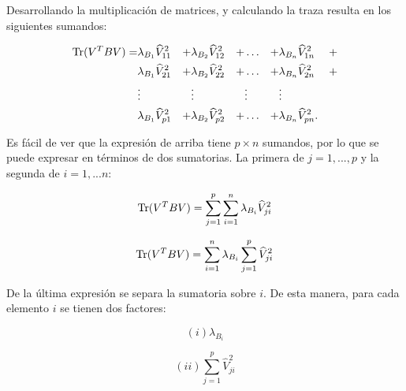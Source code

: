 Desarrollando la multiplicación de matrices, y calculando la traza resulta en los siguientes sumandos:
 
 \begin{equation*}
\begin{aligned}
      \operatorname{Tr}(V^T B V) =& \lambda_{B_1} \widehat{V}_{11}^2&  +
                     & \lambda_{B_2} \widehat{V}_{12}^2& +
                     & \hdots& +
                     &\lambda_{B_n} \widehat{V}_{1n}^2& + \\
                     & \lambda_{B_1} \widehat{V}_{21}^2&+
                     & \lambda_{B_2} \widehat{V}_{22}^2& +
                     & \hdots& +
                     &\lambda_{B_n} \widehat{V}_{2n}^2& + \\
                     & \vdots&  
                     & \vdots& 
                     & \vdots& 
                     & \vdots& \\
                     & \lambda_{B_1} \widehat{V}_{p1}^2&+
                     & \lambda_{B_2} \widehat{V}_{p2}^2& +
                     & \hdots& + 
                     & \lambda_{B_n} \widehat{V}_{pn}^2.&  
 \end{aligned}
 \end{equation*}

 Es fácil de ver que la expresión de arriba tiene $p \times n$ sumandos, por lo que se puede expresar en términos de dos sumatorias. La primera de $j=1,...,p$ y la segunda de $i = 1,...n$:

\begin{equation*} 
\operatorname{Tr}(V^T B V) = \sum \limits_{j=1}^{p} \sum\limits_{i=1}^{n} \lambda_{B_i} \widehat{V}_{ji}^2
\end{equation*}

\begin{equation}\label{eq:2.21}
\operatorname{Tr}(V^T B V) = \sum\limits_{i=1}^{n} \lambda_{B_i} \sum \limits_{j=1}^{p} \widehat{V}_{ji}^2    
\end{equation}

De la última expresión se separa la sumatoria sobre $i$. De esta manera, para cada elemento $i$ se tienen dos factores:

\begin{equation}\label{eq:2.22}
(i) \lambda_{B_i}
\end{equation}

 \begin{equation}\label{eq:2.23}
 (ii) \sum \limits_{j=1}^{p} \widehat{V}_{ji}^2   
 \end{equation}
 

